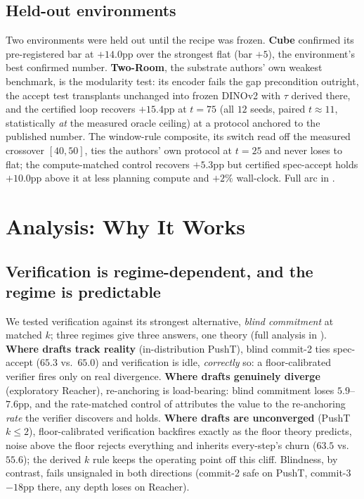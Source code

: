 \documentclass{article}
\begin{document}
\subsection{Held-out environments}
\label{sec:results-heldout}
Two environments were held out until the recipe was frozen. \textbf{Cube}
confirmed its pre-registered bar at $+14.0$pp over the strongest flat (bar
$+5$), the environment's best confirmed number. \textbf{Two-Room}, the
substrate authors' own weakest benchmark, is the modularity test: its encoder
fails the gap precondition outright, the accept test transplants unchanged
into frozen DINOv2 with $\tau$ derived there, and the certified loop recovers
$+15.4$pp at $t{=}75$ (all $12$ seeds, paired $t{\approx}11$, statistically
\emph{at} the measured oracle ceiling) at a protocol anchored to the published
number. The window-rule composite, its switch read off the measured crossover
$[40,50]$, ties the authors' own protocol at $t{=}25$ and never loses to flat;
the compute-matched control recovers $+5.3$pp but certified spec-accept holds
$+10.0$pp above it at less planning compute and $+2\%$ wall-clock. Full arc
in .

\section{Analysis: Why It Works}
\label{sec:why}

\subsection{Verification is regime-dependent, and the regime is predictable}
\label{sec:why-verifier}
We tested verification against its strongest alternative, \emph{blind
commitment} at matched $k$; three regimes give three answers, one theory (full
analysis in ). \textbf{Where drafts track reality}
(in-distribution PushT), blind commit-2 ties spec-accept ($65.3$ vs.\ $65.0$)
and verification is idle, \emph{correctly} so: a floor-calibrated verifier
fires only on real divergence. \textbf{Where drafts genuinely diverge}
(exploratory Reacher), re-anchoring is load-bearing: blind commitment loses
$5.9$--$7.6$pp, and the rate-matched control of 
attributes the value to the re-anchoring \emph{rate} the verifier discovers
and holds. \textbf{Where drafts are unconverged} (PushT $k{\le}2$),
floor-calibrated verification backfires exactly as the floor theory predicts,
noise above the floor rejects everything and inherits every-step's churn
($63.5$ vs.\ $55.6$); the derived $k$ rule keeps the operating point off this
cliff. Blindness, by contrast, fails unsignaled in both directions (commit-2
safe on PushT, commit-3 $-18$pp there, any depth loses on Reacher).
\end{document}
